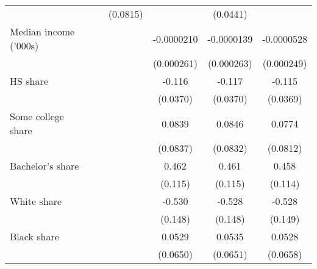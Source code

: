 {\begin{tabular}{l*{6}{c}}
                    &                     &                     &    (0.0815)         &                     &    (0.0441)         &                     \\
\addlinespace
Median income ('000s)&                     &                     &                     &  -0.0000210         &  -0.0000139         &  -0.0000528         \\
                    &                     &                     &                     &  (0.000261)         &  (0.000263)         &  (0.000249)         \\
\addlinespace
HS share            &                     &                     &                     &      -0.116\sym{***}&      -0.117\sym{***}&      -0.115\sym{***}\\
                    &                     &                     &                     &    (0.0370)         &    (0.0370)         &    (0.0369)         \\
\addlinespace
Some college share  &                     &                     &                     &      0.0839         &      0.0846         &      0.0774         \\
                    &                     &                     &                     &    (0.0837)         &    (0.0832)         &    (0.0812)         \\
\addlinespace
Bachelor's share    &                     &                     &                     &       0.462\sym{***}&       0.461\sym{***}&       0.458\sym{***}\\
                    &                     &                     &                     &     (0.115)         &     (0.115)         &     (0.114)         \\
\addlinespace
White share         &                     &                     &                     &      -0.530\sym{***}&      -0.528\sym{***}&      -0.528\sym{***}\\
                    &                     &                     &                     &     (0.148)         &     (0.148)         &     (0.149)         \\
\addlinespace
Black share         &                     &                     &                     &      0.0529         &      0.0535         &      0.0528         \\
                    &                     &                     &                     &    (0.0650)         &    (0.0651)         &    (0.0658)         \\

\end{tabular}}

